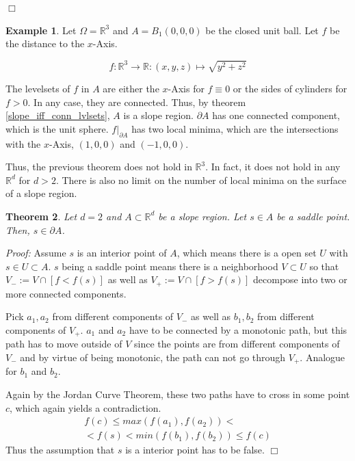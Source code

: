 \documentclass[11pt,twoside,twocolumn,a4paper]{article}
\theoremstyle{plain}
\newtheorem{thm}{Theorem}[section] %
\theoremstyle{definition}
\newtheorem{exmp}[thm]{Example} %
\begin{document}
\hfill $\Box$

\begin{exmp}
Let $\Omega = \mathbb R^3$ and $A = B_1(0,0,0)$ be the closed unit ball.
Let $f$ be the distance to the $x$-Axis. 

\begin{equation*}
f: \mathbb R^3 \to \mathbb R: (x,y,z) \mapsto \sqrt{y^2 + z^2}
\end{equation*}

The levelsets of $f$ in $A$ are either the $x$-Axis for $f \equiv 0$ or the sides of cylinders for $f > 0$.
In any case, they are connected.
Thus, by theorem \ref{slope_iff_conn_lvlsets}, $A$ is a slope region.
$\partial A$ has one connected component, which is the unit sphere.
$f|_{\partial A}$ has two local minima, which are the intersections with the $x$-Axis, $(1,0,0)$ and $(-1,0,0)$.
\end{exmp}

Thus, the previous theorem does not hold in $\mathbb R^3$.
In fact, it does not hold in any $\mathbb R^d$ for $d > 2$.
There is also no limit on the number of local minima on the surface of a slope region.

\begin{thm}
\label{thm:saddle_on_border}
Let $d = 2$ and $A \subset \mathbb R^d$ be a slope region.
Let $s \in A$ be a saddle point.
Then, $s \in \partial A$.
\end{thm}

\emph{Proof:} Assume $s$ is an interior point of $A$, which means there is a open set $U$ with $s \in U \subset A$.
$s$ being a saddle point means there is a neighborhood $V \subset U$ so that $V_- := V \cap [f < f(s)]$ as well as $V_+ := V \cap [f > f(s)]$ decompose into two or more connected components.

Pick $a_1, a_2$ from different components of $V_-$ as well as $b_1, b_2$ from different components of $V_+$.
$a_1$ and $a_2$ have to be connected by a monotonic path, but this path has to move outside of $V$ since the points are from different components of $V_-$ and by virtue of being monotonic, the path can not go through $V_+$.
Analogue for $b_1$ and $b_2$.

Again by the Jordan Curve Theorem, these two paths have to cross in some point $c$, which again yields a contradiction.
\begin{multline*}
f(c) \leq max(f(a_1), f(a_2)) < \\
< f(s) < min(f(b_1), f(b_2)) \leq f(c)
\end{multline*}
Thus the assumption that $s$ is a interior point has to be false.
\hfill $\Box$
\end{document}
